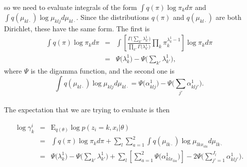 \documentclass[12pt,a4paper,reqno]{article}
\newcommand{\E}{\text{E}{}}
\newcommand{\(}{\left(}
\newcommand{\)}{\right)}
\newcommand{\|}{\arrowvert}
\renewcommand{\digamma}{\Psi}
\begin{document}
so we need to evaluate integrals of the form $\int q(\pi) \log \pi_{k} d\pi$ and $\int q(\mu_{kl\cdot}) \log \mu_{klj} d\mu_{kl\cdot}$. Since the distributions $q(\pi)$ and $q(\mu_{kl\cdot})$ are both Dirichlet, these have the same form. The first is
\begin{eqnarray*}
\int q(\pi) \log \pi_{k} d\pi 
&=& \int \left[\frac{\Gamma\Big(\sum_{k'}\lambda^{1}_{k'}\Big)}{\prod_{k'}\Gamma\Big(\lambda^{1}_{k'}\Big)}\prod_{k}\pi_{k}^{\lambda^{1}_{k}-1}\right] \log \pi_{k} d\pi \\
&=& \digamma\Big(\lambda^{1}_{k}\Big) - \digamma\Big(\sum_{k'}\lambda^{1}_{k'}\Big),
\end{eqnarray*}
where $\digamma$ is the digamma function, and the second one is
\begin{equation*}
\int q(\mu_{kl\cdot}) \log \mu_{klj} d\mu_{kl\cdot} = \digamma\Big(\alpha^{1}_{klj}\Big) - \digamma\Big(\sum_{j'}\alpha^{1}_{klj'}\Big).
\end{equation*}

\paragraph{}
The expectation that we are trying to evaluate is then

\begin{eqnarray*}
\log \gamma^{i}_{k} 
&=& \E_{q(\theta)}\log p(z_{i}=k,x_{i}|\theta) \\
&=& \int q(\pi) \log \pi_{k} d\pi + \sum_{l}\sum_{a=1}^{2}\int q(\mu_{lk\cdot}) \log \mu_{lkx_{ila}} d\mu_{lk\cdot} \\
&=& \digamma\Big(\lambda^{1}_{k}\Big) - \digamma\Big(\sum_{k'}\lambda^{1}_{k'}\Big) + \sum_{l} \left[\sum_{a=1}^{2} \digamma\Big(\alpha^{1}_{klx_{lia}}\Big)\right] - 2\digamma\Big(\sum_{j'=1}^{J_{l}}\alpha^{1}_{klj'}\Big).
\end{eqnarray*}
\end{document}
